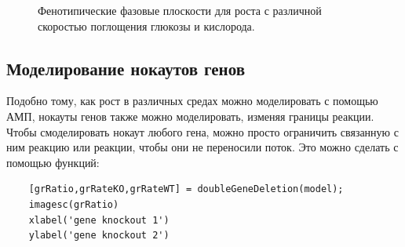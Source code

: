 \documentclass[a4paper, 12pt]{article}
\begin{document}
\begin{figure}[H]
    \label{fig:ph_ph}
\end{figure}

\begin{figure}[H]
    \caption{Фенотипические фазовые плоскости для роста с различной скоростью поглощения глюкозы и кислорода.}
    \label{fig:ph_ph_2}
\end{figure}

\subsection{Моделирование нокаутов генов}

Подобно тому, как рост в различных средах можно моделировать с помощью АМП, нокауты генов также можно моделировать, изменяя границы реакции. Чтобы смоделировать нокаут любого гена, можно просто ограничить связанную с ним реакцию или реакции, чтобы они не переносили поток. Это можно сделать с помощью функций:
\begin{lstlisting}
    [grRatio,grRateKO,grRateWT] = doubleGeneDeletion(model);
    imagesc(grRatio)
    xlabel('gene knockout 1')
    ylabel('gene knockout 2')
\end{lstlisting}
\end{document}
